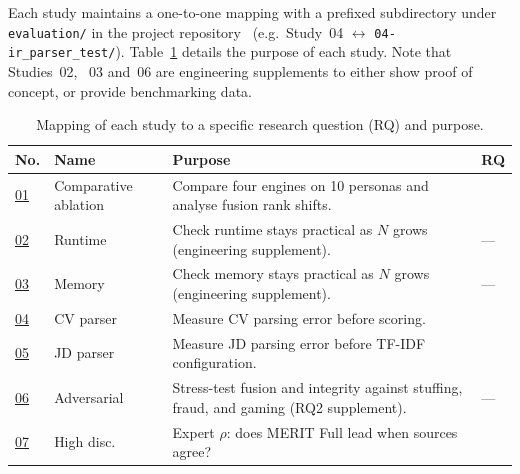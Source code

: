 Each study maintains a one-to-one mapping with a prefixed subdirectory under \texttt{evaluation/} 
in the project repository~\cite{merit_repo} (e.g.\ Study~04 $\leftrightarrow$ \texttt{04-ir\_parser\_test/}).
Table~\ref{tab:eval-study-catalogue} details the purpose of each study. 
Note that Studies~02, ~03 and~06 are engineering supplements to either show proof of concept, or provide benchmarking data.

\begin{table}[H]
    \centering
    \caption[Evaluation study catalogue]{Mapping of each study to a specific research question (RQ) and purpose.}
    \label{tab:eval-study-catalogue}
    \footnotesize
    \renewcommand{\arraystretch}{1.28}
    \setlength{\tabcolsep}{5pt}
    \setlength{\extrarowheight}{1pt}
    \def\tabularxcolumn#1{m{#1}}%
    \begin{tabularx}{\textwidth}{@{}%
        >{\centering\arraybackslash}m{0.65cm}
        >{\centering\arraybackslash\hyphenpenalty=10000\exhyphenpenalty=10000}m{2.1cm}
        >{\raggedright\arraybackslash}X
        >{\centering\arraybackslash}m{0.48cm} @{}}
        \toprule
        \textbf{No.} & \textbf{Name} & \textbf{Purpose} & \textbf{RQ} \\
        \midrule
        \hyperref[subsec:study-01-comparative-ablation]{01} & Comparative ablation &
        Compare four engines on 10 personas and analyse fusion rank shifts. &
        2 \\
        \hyperref[subsec:studies-02-03-scalability]{02} & Runtime &
        Check runtime stays practical as $N$ grows (engineering supplement). &
        --- \\
        \hyperref[subsec:studies-02-03-scalability]{03} & Memory &
        Check memory stays practical as $N$ grows (engineering supplement). &
        --- \\
        \hyperref[subsec:study-04]{04} & CV parser &
        Measure CV parsing error before scoring. &
        1 \\
        \hyperref[subsec:study-05]{05} & JD parser &
        Measure JD parsing error before TF-IDF configuration. &
        1 \\
        \hyperref[subsec:study-06-adversarial]{06} & Adversarial &
        Stress-test fusion and integrity against stuffing, fraud, and gaming (RQ2 supplement). &
        --- \\
        \hyperref[subsec:study-07-spearman-high-discrimination]{07} & High disc. &
        Expert $\rho$: does MERIT Full lead when sources agree? &
        2 \\

\end{tabularx}
\end{table}
